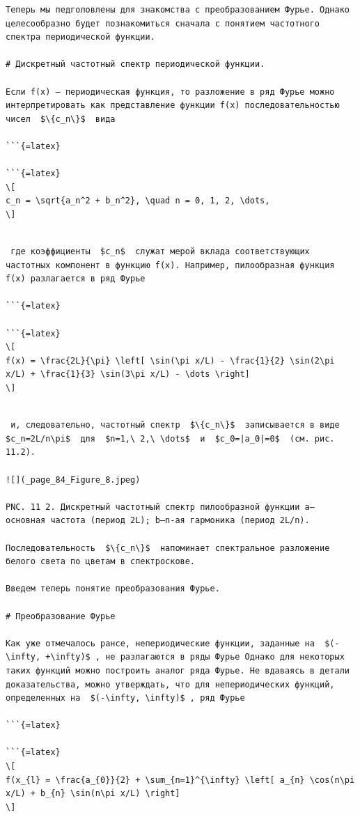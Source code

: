 \documentclass[
  ukrainian,
]{article}
\begin{document}
\begin{verbatim}
Теперь мы педголовлены для знакомства с преобразованием Фурье. Однако целесообразно будет познакомиться сначала с понятием частотного спектра периодической функции.

# Дискретный частотный спектр периодической функции.

Если f(x) — периодическая функция, то разложение в ряд Фурье можно интерпретировать как представление функции f(x) последовательностью чисел  $\{c_n\}$  вида

```{=latex}

```{=latex}
\[
c_n = \sqrt{a_n^2 + b_n^2}, \quad n = 0, 1, 2, \dots,
\]
\end{verbatim}

\begin{verbatim}

 где коэффициенты  $c_n$  служат мерой вклада соответствующих частотных компонент в функцию f(x). Например, пилообразная функция f(x) разлагается в ряд Фурье

```{=latex}

```{=latex}
\[
f(x) = \frac{2L}{\pi} \left[ \sin(\pi x/L) - \frac{1}{2} \sin(2\pi x/L) + \frac{1}{3} \sin(3\pi x/L) - \dots \right]
\]
\end{verbatim}

\begin{verbatim}

 и, следовательно, частотный спектр  $\{c_n\}$  записывается в виде  $c_n=2L/n\pi$  для  $n=1,\ 2,\ \dots$  и  $c_0=|a_0|=0$  (см. рис. 11.2).

![](_page_84_Figure_8.jpeg)

PNC. 11 2. Дискретный частотный спектр пилообразной функции a— основная частота (период 2L); b—n-ая гармоника (период 2L/n).

Последовательность  $\{c_n\}$  напоминает спектральное разложение белого света по цветам в спектроскове.

Введем теперь понятие преобразования Фурье.

# Преобразование Фурье

Как уже отмечалось рансе, непериодические функции, заданные на  $(-\infty, +\infty)$ , не разлагаются в ряды Фурье Однако для некоторых таких функций можно построить аналог ряда Фурье. Не вдаваясь в детали доказательства, можно утверждать, что для непериодических функций, определенных на  $(-\infty, \infty)$ , ряд Фурье

```{=latex}

```{=latex}
\[
f(x_{l} = \frac{a_{0}}{2} + \sum_{n=1}^{\infty} \left[ a_{n} \cos(n\pi x/L) + b_{n} \sin(n\pi x/L) \right]
\]
\end{verbatim}
\end{document}
